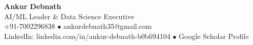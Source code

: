 \documentclass[letterpaper,11pt]{article}
\begin{document}
\colorbox{headerblue}{%
  \begin{minipage}{\textwidth}
    \centering
    \color{white}
    \vspace{8pt}
    {\Huge\bfseries Ankur Debnath} \\[8pt]
    {\large AI/ML Leader \& Data Science Executive} \\[6pt]
    \small +91-7002296838 $\bullet$ ankurdebnath35@gmail.com \\
    LinkedIn: linkedin.com/in/ankur-debnath-b0b694104 $\bullet$ Google Scholar Profile
    \vspace{8pt}
  \end{minipage}
}

\vspace{12pt}

\end{document}
